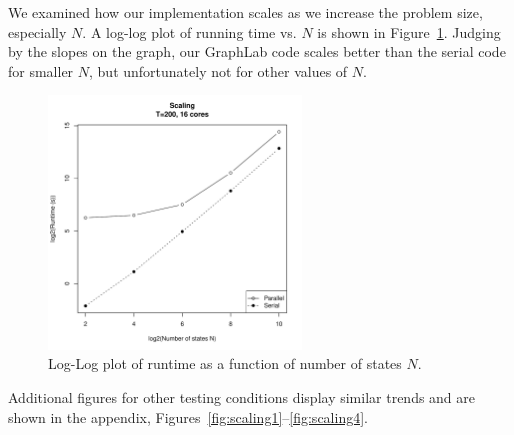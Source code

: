 We examined how our implementation scales as we increase the
problem size, especially $N$. A log-log plot of running time vs. $N$ is shown in
Figure~\ref{fig:scaling-16-200}. Judging by the slopes on the graph, our
GraphLab code scales better than the serial code for smaller $N$, but unfortunately not for other values of $N$. 

\begin{figure}[htb]
    \centering
    \includegraphics[width=0.6\textwidth]{../figure/scaling-cores_16-T_200.pdf}
    \caption{Log-Log plot of runtime as a function of number of states $N$.}
    \label{fig:scaling-16-200}
\end{figure}

Additional figures for other testing conditions display similar trends and are
shown in the appendix, Figures~\ref{fig:scaling1}--\ref{fig:scaling4}. 
